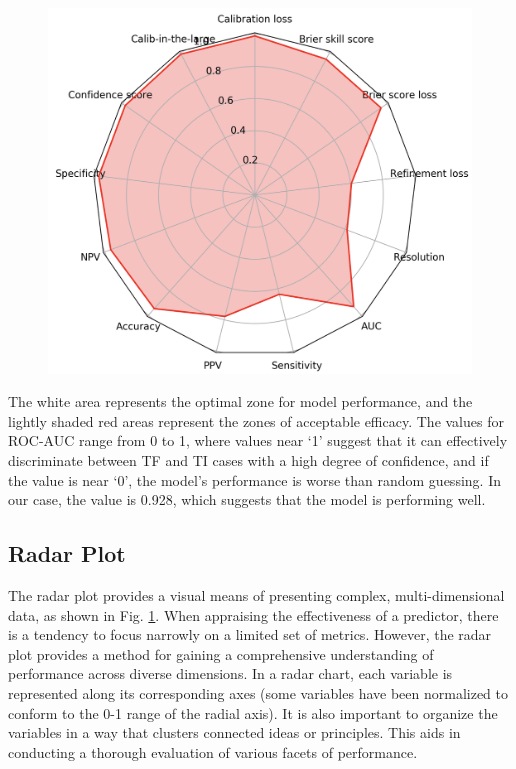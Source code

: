 \begin{figure}[]
\begin{minipage}{0.30\textwidth}
\label{fig:gan5}
\end{minipage}
\hspace{0.5em}
\begin{minipage}{0.35\textwidth}
\centering
\includegraphics[width=\textwidth]{figs/radar.png}
\label{fig:radar}
\end{minipage}
\end{figure}

The white area represents the optimal zone for model performance, and the lightly shaded red areas represent the zones of acceptable efficacy. The values for ROC-AUC range from 0 to 1, where values near `1' suggest that it can effectively discriminate between TF and TI cases with a high degree of confidence, and if the value is near `0', the model's performance is worse than random guessing. In our case, the value is 0.928, which suggests that the model is performing well.

\subsection*{Radar Plot}
The radar plot provides a visual means of presenting complex, multi-dimensional data, as shown in Fig. \ref{fig:radar}. When appraising the effectiveness of a predictor, there is a tendency to focus narrowly on a limited set of metrics. However, the radar plot provides a method for gaining a comprehensive understanding of performance across diverse dimensions. In a radar chart, each variable is represented along its corresponding axes (some variables have been normalized to conform to the 0-1 range of the radial axis). It is also important to organize the variables in a way that clusters connected ideas or principles. This aids in conducting a thorough evaluation of various facets of performance.

